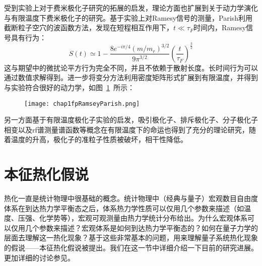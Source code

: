 受到实验上对于费米极化子研究的拓展的启发，理论方面也扩展到关于动力学演化与有限温度下费米极化子的研究。基于实验上对Ramesy信号的测量，Parish利用截断粒子空穴的波函数方法\cite{Parish2016quantum}，发现在短程相互作用下，$t\ll \tau_F$时间内，Ramesy信号具有行为：
\begin{equation}
S(t) \simeq 1-\frac{8 e^{-i \pi / 4}\left(m / m_{r}\right)^{3 / 2}}{9 \pi^{3 / 2}}\left(\frac{t}{\tau_{F}}\right)^{\frac{3}{2}}
\end{equation}
这与期望中的微扰论平方行为完全不同，并且不依赖于散射长度。长时间行为可以通过数值求解得到。进一步将变分方法利用密度矩阵形式扩展到有限温度，并得到与实验\cite{cetina2016ultrafast}符合很好的动力学\cite{Liu2019variational}，如图~\ref{RamseyParish}~所示：
\begin{figure}[!htbp]
    \centering
    \texttt{[image: chap1fpRamseyParish.png]}
    \label{RamseyParish}
\end{figure}


另一方面基于有限温度极化子实验的启发\cite{YanBoiling}，吸引极化子、排斥极化子、分子极化子相变以及rf谱测量谱函数等概念在有限温度下的命运也得到了充分的理论研究，随着温度的升高，极化子的准粒子性质被破坏，相干性降低\cite{tajima2018many,Hu2018attractive,mulkerin2019breakdown,Taylor2019thermal,Liu2020Radio,Liu2020theory,Parish2021thermodynamic}。



\section{本征热化假说}
热化一直是统计物理中很基础的概念。统计物理中（经典与量子）宏观数目自由度体系在到达热力学平衡态之后，体系热力学性质可以仅用几个参数来描述（如温度、压强、化学势等），宏观可观测量由热力学统计分布给出。为什么宏观体系可以仅用几个参数来描述？宏观体系是如何到达热力学平衡态的？如何在量子力学的层面去理解这一热化现象？基于这些非常基本的问题，用来理解量子系统热化现象的假说——本征热化假说被提出。我们在这一节中详细介绍一下目前的研究进展。更加详细的讨论参见\cite{d2016quantum,deutsch2018eigenstate}。

